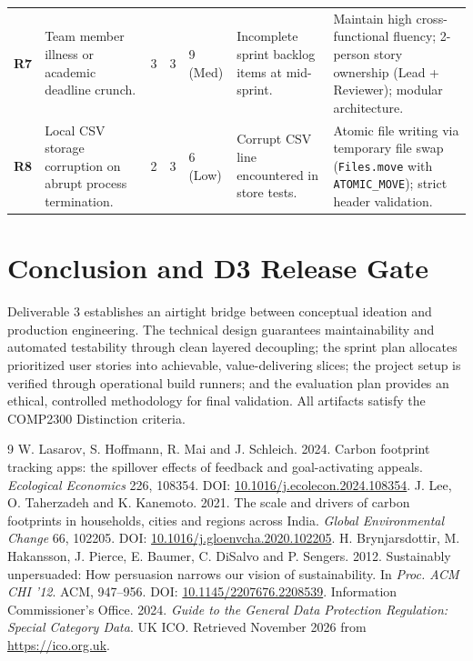 \documentclass[12pt,a4paper]{article}
\newcommand{\code}[1]{\texttt{#1}}
\begin{document}
\begin{table}[ht]
\begin{tabularx}{\textwidth}{@{}p{0.8cm}p{2.6cm}ccp{1.0cm}p{3.2cm}p{3.6cm}@{}}
\textbf{R7} & Team member illness or academic deadline crunch. & 3 & 3 & 9 (Med) & Incomplete sprint backlog items at mid-sprint. & Maintain high cross-functional fluency; 2-person story ownership (Lead + Reviewer); modular architecture.\\
\textbf{R8} & Local CSV storage corruption on abrupt process termination. & 2 & 3 & 6 (Low) & Corrupt CSV line encountered in store tests. & Atomic file writing via temporary file swap (\code{Files.move} with \code{ATOMIC_MOVE}); strict header validation.\\
\bottomrule
\end{tabularx}
\end{table}

\section{Conclusion and D3 Release Gate}
Deliverable 3 establishes an airtight bridge between conceptual ideation and production engineering. The technical design guarantees maintainability and automated testability through clean layered decoupling; the sprint plan allocates prioritized user stories into achievable, value-delivering slices; the project setup is verified through operational build runners; and the evaluation plan provides an ethical, controlled methodology for final validation. All artifacts satisfy the COMP2300 Distinction criteria.

\begin{thebibliography}{9}
 W. Lasarov, S. Hoffmann, R. Mai and J. Schleich. 2024. Carbon footprint tracking apps: the spillover effects of feedback and goal-activating appeals. \emph{Ecological Economics} 226, 108354. DOI: \href{https://doi.org/10.1016/j.ecolecon.2024.108354}{10.1016/j.ecolecon.2024.108354}.
 J. Lee, O. Taherzadeh and K. Kanemoto. 2021. The scale and drivers of carbon footprints in households, cities and regions across India. \emph{Global Environmental Change} 66, 102205. DOI: \href{https://doi.org/10.1016/j.gloenvcha.2020.102205}{10.1016/j.gloenvcha.2020.102205}.
 H. Brynjarsdottir, M. Hakansson, J. Pierce, E. Baumer, C. DiSalvo and P. Sengers. 2012. Sustainably unpersuaded: How persuasion narrows our vision of sustainability. In \emph{Proc. ACM CHI '12}. ACM, 947--956. DOI: \href{https://doi.org/10.1145/2207676.2208539}{10.1145/2207676.2208539}.
 Information Commissioner's Office. 2024. \emph{Guide to the General Data Protection Regulation: Special Category Data}. UK ICO. Retrieved November 2026 from \url{https://ico.org.uk}.
\end{thebibliography}
\end{document}
